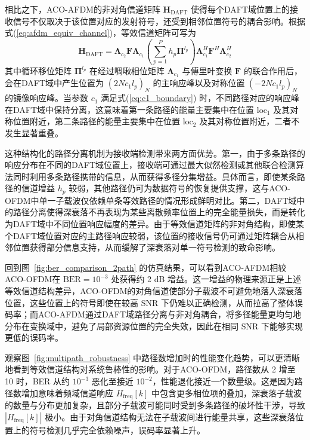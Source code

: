 相比之下，ACO-AFDM的非对角信道矩阵 $\mathbf{H}_{\mathrm{DAFT}}$ 使得每个DAFT域位置上的接收信号不仅取决于该位置对应的发射符号，还受到相邻位置符号的耦合影响。根据式(\ref{eq:afdm_equiv_channel})，等效信道矩阵可写为
\begin{equation}
\mathbf{H}_{\mathrm{DAFT}} = \boldsymbol{\Lambda}_{c_2} \mathbf{F} \boldsymbol{\Lambda}_{c_1} \left( \sum_{p=1}^{P} h_p \boldsymbol{\Pi}^{l_p} \right) \boldsymbol{\Lambda}_{c_1}^{H} \mathbf{F}^{H} \boldsymbol{\Lambda}_{c_2}^{H}
\end{equation}
其中循环移位矩阵 $\boldsymbol{\Pi}^{l_p}$ 在经过啁啾相位矩阵 $\boldsymbol{\Lambda}_{c_1}$ 与傅里叶变换 $\mathbf{F}$ 的联合作用后，会在DAFT域中产生位置为 $(2Nc_1 l_p)_N$ 的主响应峰以及对称位置 $(-2Nc_1 l_p)_N$ 的镜像响应峰。当参数 $c_1$ 满足式(\ref{eq:c1_boundary}) 时，不同路径对应的响应峰在DAFT域中保持分离，这意味着第一条路径的能量主要集中在位置 $\mathrm{loc}_1$ 及其对称位置附近，第二条路径的能量主要集中在位置 $\mathrm{loc}_2$ 及其对称位置附近，二者不发生显著重叠。

这种结构化的路径分离机制为接收端检测带来两方面优势。第一，由于多条路径的响应分布在不同的DAFT域位置上，接收端可通过最大似然检测或其他联合检测算法同时利用多条路径携带的信息，从而获得多径分集增益。具体而言，即使某条路径的信道增益 $h_p$ 较弱，其他路径仍可为数据符号的恢复提供支撑，这与ACO-OFDM中单一子载波仅依赖单条等效路径的情况形成鲜明对比。第二，DAFT域中的路径分离使得深衰落不再表现为某些离散频率位置上的完全能量损失，而是转化为DAFT域中不同位置响应幅度的差异。由于等效信道矩阵的非对角结构，即使某个DAFT域位置对应的主路径响应较弱，该位置的接收信号仍可通过矩阵耦合从相邻位置获得部分信息支持，从而缓解了深衰落对单一符号检测的致命影响。

回到图~\ref{fig:ber_comparison_2path} 的仿真结果，可以看到ACO-AFDM相较ACO-OFDM在 $\mathrm{BER}=10^{-3}$ 处获得约 2 dB 增益。这一增益的物理来源正是上述等效信道结构差异，ACO-OFDM的对角信道使部分子载波不可避免地落入深衰落位置，这些位置上的符号即使在较高 SNR 下仍难以正确检测，从而拉高了整体误码率；而ACO-AFDM通过DAFT域路径分离与非对角耦合，将多径能量更均匀地分布在变换域中，避免了局部资源位置的完全失效，因此在相同 SNR 下能够实现更低的误码率。

观察图~\ref{fig:multipath_robustness} 中路径数增加时的性能变化趋势，可以更清晰地看到等效信道结构对系统鲁棒性的影响。对于ACO-OFDM，路径数从 2 增至 10 时，BER 从约 $10^{-3}$ 恶化至接近 $10^{-2}$，性能退化接近一个数量级。这是因为路径数增加意味着频域信道响应 $H_{\mathrm{freq}}[k]$ 中包含更多相位项的叠加，深衰落子载波的数量与分布更加复杂，且部分子载波可能同时受到多条路径的破坏性干涉，导致 $|H_{\mathrm{freq}}[k]|$ 极小。由于对角信道结构无法在子载波间进行能量共享，这些深衰落位置上的符号检测几乎完全依赖噪声，误码率显著上升。


